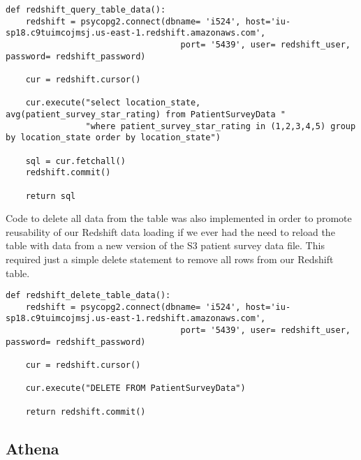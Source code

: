 \begin{verbatim}
def redshift_query_table_data():
    redshift = psycopg2.connect(dbname= 'i524', host='iu-sp18.c9tuimcojmsj.us-east-1.redshift.amazonaws.com',
                                   port= '5439', user= redshift_user, password= redshift_password)

    cur = redshift.cursor()

    cur.execute("select location_state, avg(patient_survey_star_rating) from PatientSurveyData "
                "where patient_survey_star_rating in (1,2,3,4,5) group by location_state order by location_state")

    sql = cur.fetchall()
    redshift.commit()

    return sql
\end{verbatim}	

Code to delete all data from the table was also implemented in order to promote reusability of our Redshift data loading if we ever had the need to reload the table with data from a new version of the S3 patient survey data file. This required just a simple delete statement to remove all rows from our Redshift table. 

\begin{verbatim}
def redshift_delete_table_data():
    redshift = psycopg2.connect(dbname= 'i524', host='iu-sp18.c9tuimcojmsj.us-east-1.redshift.amazonaws.com',
                                   port= '5439', user= redshift_user, password= redshift_password)

    cur = redshift.cursor()

    cur.execute("DELETE FROM PatientSurveyData")

    return redshift.commit()
\end{verbatim}

\subsection{Athena}

